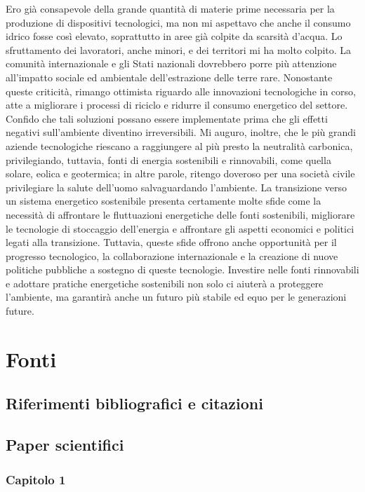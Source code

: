 \documentclass[12pt,a4paper,oneside]{book}
\begin{document}
Ero già consapevole della grande quantità di materie prime necessaria per la produzione di dispositivi tecnologici, ma non mi aspettavo che anche il consumo idrico fosse così elevato, soprattutto in aree già colpite da scarsità d'acqua. 
Lo sfruttamento dei lavoratori, anche minori, e dei territori mi ha molto colpito. La comunità internazionale e gli Stati nazionali dovrebbero porre più attenzione all'impatto sociale ed ambientale dell'estrazione delle terre rare.
Nonostante queste criticità, rimango ottimista riguardo alle innovazioni tecnologiche in corso, atte a migliorare i processi di riciclo e ridurre il consumo energetico del settore. Confido che tali soluzioni possano essere implementate prima che gli effetti negativi sull'ambiente diventino irreversibili.
Mi auguro, inoltre, che le più grandi aziende tecnologiche riescano a raggiungere al più presto la neutralità carbonica, privilegiando, tuttavia, fonti di energia sostenibili e rinnovabili, come quella solare, eolica e geotermica; in altre parole, ritengo doveroso per una società civile privilegiare la salute dell'uomo salvaguardando l'ambiente. La transizione verso un sistema energetico sostenibile presenta certamente molte sfide come la necessità di affrontare le fluttuazioni energetiche delle fonti sostenibili, migliorare le tecnologie di stoccaggio dell'energia e affrontare gli aspetti economici e politici legati alla transizione.
Tuttavia, queste sfide offrono anche opportunità per il progresso tecnologico, la collaborazione internazionale e la creazione di nuove politiche pubbliche a sostegno di queste tecnologie. Investire nelle fonti rinnovabili e adottare pratiche energetiche sostenibili non solo ci aiuterà a proteggere l'ambiente, ma garantirà anche un futuro più stabile ed equo per le generazioni future.

\newpage

\chapter*{Fonti}
\renewcommand{\bibsection}{}
\section*{Riferimenti bibliografici e citazioni}
\nocite{*}


\section*{Paper scientifici}
\subsection*{Capitolo 1}
\sloppy
\end{document}
